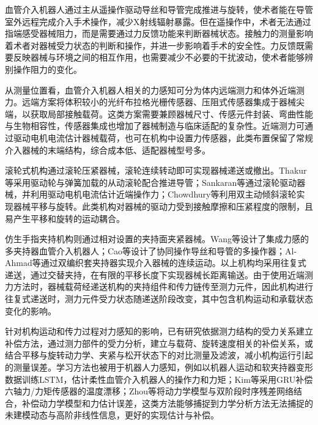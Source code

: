 \documentclass{JQR_LaTeX_Template-0507/JQRnew}
\begin{document}
\maketitle
\raggedbottom

\makeatletter
{}
\makeatother
血管介入机器人通过主从遥操作驱动导丝和导管完成推进与旋转，使术者能在导管室外远程完成介入手术操作，减少X射线辐射暴露。但在遥操作中，术者无法通过指端感受器械阻力，而是需要通过力反馈功能来判断器械状态。接触力的测量影响着术者对器械受力状态的判断和操作，并进一步影响着手术的安全性。力反馈既需要反映器械与环境之间的相互作用，也需要减少不必要的干扰波动，使术者能够辨别操作阻力的变化。

 从测量位置看，血管介入机器人相关的力感知可分为体内远端测力和体外近端测力。远端方案将体积较小的光纤布拉格光栅传感器、压阻式传感器集成于器械尖端，以获取局部接触载荷。这类方案需要兼顾器械尺寸、传感元件封装、弯曲性能与生物相容性，传感器集成也增加了器械制造与临床适配的复杂性。近端测力可通过驱动电机电流估计器械载荷，也可在机构中设置力传感器，此类布置保留了常规介入器械的末端结构，综合成本低、适配器械型号多。

滚轮式机构通过滚轮压紧器械，滚轮连续转动即可实现器械递送或撤出。Thakur等采用驱动轮与弹簧加载的从动滚轮配合推进导管；Sankaran等通过滚轮驱动器械，并利用驱动电机电流估计近端操作力；Chowdhury等利用双主动倾斜滚轮实现器械平移与旋转。此类机构对器械的驱动力受到接触摩擦和压紧程度的限制，且易产生平移和旋转的运动耦合。

 仿生手指夹持机构则通过相对设置的夹持面夹紧器械。Wang等设计了集成力感的多夹持器血管介入机器人；Cao等设计了协同操作导丝和导管的多操作器；Al-Ahmad等通过双编织套夹持器实现介入器械的连续运动。以上机构均采用往复式递送，通过交替夹持，在有限的平移长度下实现器械长距离输送。由于使用近端测力方法时，器械载荷经递送机构的夹持组件和传力链传至测力元件，因此机构进行往复式递送时，测力元件受力状态随递送阶段改变，其中包含机构运动和承载状态变化的影响。

 针对机构运动和传力过程对力感知的影响，已有研究依据测力结构的受力关系建立补偿方法，通过测力部件的受力分析，建立与载荷、旋转速度相关的补偿关系，或结合平移与旋转动力学、夹紧与松开状态下的对比测量及滤波，减小机构运行引起的测量误差。学习方法也被用于机器人力感知，例如以机器人运动和软夹持器变形数据训练LSTM，估计柔性血管介入机器人的操作力和力矩；Kim等采用GRU补偿六轴力/力矩传感器的温度漂移；Zhou等将动力学模型与双阶段时序残差网络结合，补偿动力学模型和力估计误差，这类方法能够捕捉到力学分析方法无法捕捉的未建模动态与高阶非线性信息，更好的实现估计与补偿。
\end{document}
